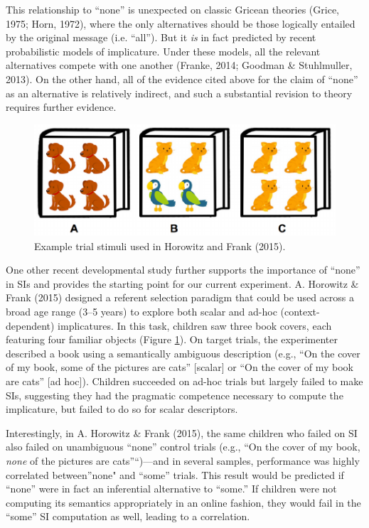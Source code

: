 \documentclass[10pt, letterpaper]{article}
\newenvironment{CodeChunk}{}{}
\begin{document}
This relationship to ``none'' is unexpected on classic Gricean theories
(Grice, 1975; Horn, 1972), where the only alternatives should be those
logically entailed by the original message (i.e. ``all''). But it
\emph{is} in fact predicted by recent probabilistic models of
implicature. Under these models, all the relevant alternatives compete
with one another (Franke, 2014; Goodman \& Stuhlmuller, 2013). On the
other hand, all of the evidence cited above for the claim of ``none'' as
an alternative is relatively indirect, and such a substantial revision
to theory requires further evidence.

\begin{CodeChunk}
\begin{figure}[b]

{\centering \includegraphics{figs/image-1} 

}

\caption[Example trial stimuli used in Horowitz and Frank (2015)]{Example trial stimuli used in Horowitz and Frank (2015).}\label{fig:image}
\end{figure}
\end{CodeChunk}

One other recent developmental study further supports the importance of
``none'' in SIs and provides the starting point for our current
experiment. A. Horowitz \& Frank (2015) designed a referent selection
paradigm that could be used across a broad age range (3--5 years) to
explore both scalar and ad-hoc (context-dependent) implicatures. In this
task, children saw three book covers, each featuring four familiar
objects (Figure \ref{fig:image}). On target trials, the experimenter
described a book using a semantically ambiguous description (e.g., ``On
the cover of my book, some of the pictures are cats'' {[}scalar{]} or
``On the cover of my book are cats'' {[}ad hoc{]}). Children succeeded
on ad-hoc trials but largely failed to make SIs, suggesting they had the
pragmatic competence necessary to compute the implicature, but failed to
do so for scalar descriptors.

Interestingly, in A. Horowitz \& Frank (2015), the same children who
failed on SI also failed on unambiguous ``none'' control trials (e.g.,
``On the cover of my book, \emph{none} of the pictures are
cats''``)---and in several samples, performance was highly correlated
between''none" and ``some'' trials. This result would be predicted if
``none'' were in fact an inferential alternative to ``some.'' If
children were not computing its semantics appropriately in an online
fashion, they would fail in the ``some'' SI computation as well, leading
to a correlation.
\end{document}
